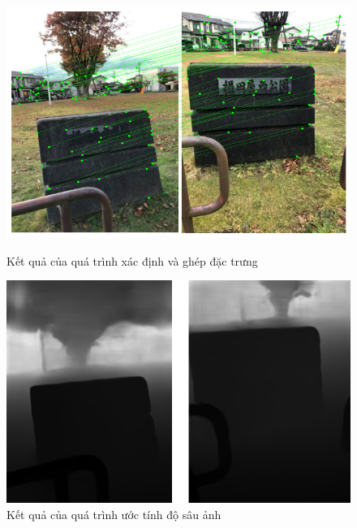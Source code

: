 \begin{figure}[H]
  \centering
  \begin{minipage}[b]{0.48\textwidth}
    \captionsetup{justification=centering}
    \includegraphics[width=\textwidth]{pics/Proposal/matching.png}
    \caption{Kết quả của quá trình xác định và ghép đặc trưng}
  \end{minipage}
  \begin{minipage}[b]{0.48\textwidth}
    \captionsetup{justification=centering}
    \includegraphics[width=\textwidth]{pics/Proposal/depth.png}
    \caption{Kết quả của quá trình ước tính độ sâu ảnh}
  \end{minipage}
\end{figure}

